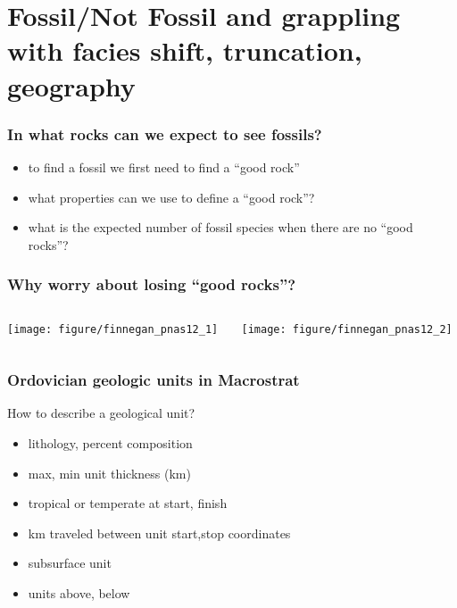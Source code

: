 \documentclass{beamer}
\begin{document}
\section{Fossil/Not Fossil and grappling with facies shift, truncation, geography}

\begin{frame}
  \frametitle{In what rocks can we expect to see fossils?}
  \begin{itemize}
    \item \alert{to find a fossil we first need to find a ``good rock''}
    \item what properties can we use to define a ``good rock''?
    \item what is the expected number of fossil species when there are no ``good rocks''?
  \end{itemize}
\end{frame}

\begin{frame}
  \frametitle{Why worry about losing ``good rocks''?}
  \begin{columns}
    \begin{column}{0.5\textwidth}
      \begin{center}
        \texttt{[image: figure/finnegan\_pnas12\_1]}
      \end{center}
    \end{column}
    \begin{column}{0.5\textwidth}
      \begin{center}
        \texttt{[image: figure/finnegan\_pnas12\_2]}
      \end{center}
    \end{column}
  \end{columns}
    
  \tiny{}
\end{frame}

\begin{frame}
  \frametitle{Ordovician geologic units in Macrostrat}

  \begin{block}{How to describe a geological unit?}
    \begin{itemize}
      \item lithology, percent composition
      \item max, min unit thickness (km)
      \item tropical or temperate at start, finish
      \item km traveled between unit start,stop coordinates
      \item subsurface unit
      \item units above, below
    \end{itemize}
  \end{block}
\end{frame}
\end{document}
